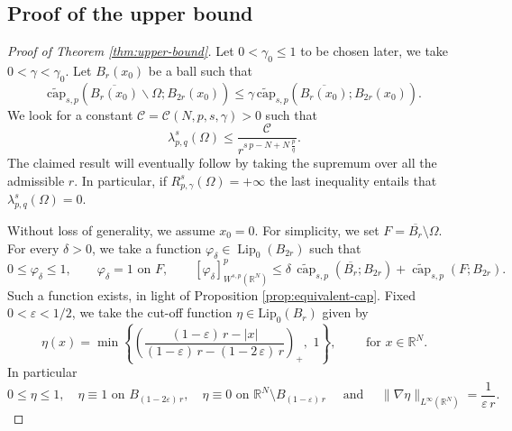 \documentclass{amsart}
\theoremstyle{definition}
\numberwithin{equation}{section}
\begin{document}
\subsection{Proof of the upper bound} \label{sec:proof-ub}

\begin{proof}[Proof of Theorem \ref{thm:upper-bound}]
	Let $0 < \gamma_0 \le 1$ to be chosen later, we take $0<\gamma<\gamma_0$. Let $B_r(x_0)$ be a ball such that 
	\begin{equation}\label{gamma_cap p>1}
		\widetilde{\mathrm{cap}}_{s,p}\left(\overline{B_r\left(x_0\right)} \backslash \Omega ; B_{2 r}\left(x_0\right)\right) \leq \gamma\,\widetilde{\mathrm{cap}}_{s,p}\left(\overline{B_r\left(x_0\right)} ; B_{2 r}\left(x_0\right)\right).
	\end{equation}
	We look for a constant $\mathcal{C} = \mathcal{C}(N,p, s,\gamma) > 0$ such that
	\begin{equation} \label{claim_upper_bound_1 p>1}
		\lambda^s_{p, q}(\Omega) \leq \frac{\mathcal{C}}{r^{s\,p - N + N\,\frac{p}{q}}}. 
	\end{equation}
	The claimed result will eventually follow by taking the supremum over all the admissible $r$. In particular, if $R^s_{p, \gamma}(\Omega) = +\infty$ the last inequality entails that $\lambda^s_{p, q}(\Omega) = 0$. 
	\par
	Without loss of generality, we assume $x_0=0$. For simplicity, we set $F=\overline{B_r} \setminus \Omega$. For every $\delta>0$, we take a function $\varphi_\delta\in \operatorname{Lip}_0\left(B_{2 r}\right)$ such that 
	\begin{equation} \label{cap-approximation p>1}
		0\leq \varphi_\delta \leq 1, \qquad \varphi_\delta=1 \text { on } F, \qquad [\varphi_\delta]^p_{W^{s,p}(\mathbb{R}^N)}\leq \delta\,\widetilde{\operatorname{cap}}_{s,p}\left(\overline{B_r};B_{2r}\right)+\widetilde{\operatorname{cap}}_{s, p}\left(F ; B_{2 r}\right).
	\end{equation} 
	Such a function exists, in light of Proposition \ref{prop:equivalent-cap}. Fixed $0 < \varepsilon < 1/2$, we take the cut-off function $\eta \in \mathrm{Lip}_0(B_r)$ given by 
	\[
	\eta(x) = \min\left\{\left(\dfrac{(1-\varepsilon)\,r - |x|}{(1 - \varepsilon)\,r - (1- 2\,\varepsilon)\,r}\right)_{+},\,\, 1\right\}, \qquad \mbox{ for } x \in \mathbb{R}^N.
	\]
	In particular
	\begin{equation} \label{cut-off-upper-bound}
		0 \leq \eta \leq 1, \quad \eta \equiv 1 \mbox{ on } B_{(1-2\varepsilon)\,r}, \quad  \eta \equiv 0 \mbox{ on } \mathbb{R}^N \setminus B_{(1-\varepsilon)\,r} \quad \mbox{ and } \quad \|\nabla \eta\|_{L^\infty(\mathbb{R}^N)} = \frac{1}{\varepsilon\,r}.

\end{equation}
\end{proof}
\end{document}
